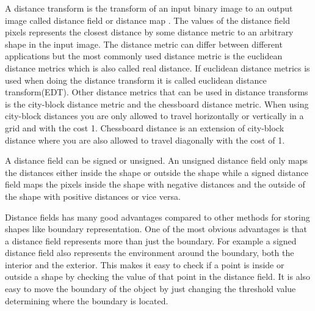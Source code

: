 A distance transform is the transform of an input binary image to an output image called distance field or distance map \citep{rosenfeld1966}. The values of the distance field pixels represents the closest distance by some distance metric to an arbitrary shape in the input image. The distance metric can differ between different applications but the most commonly used distance metric is the euclidean distance metrics which is also called real distance. If euclidean distance metrics is used when doing the distance transform it is called euclidean distance transform(EDT). Other distance metrics that can be used in distance transforms is the city-block distance metric and the chessboard distance metric. When using city-block distances you are only allowed to travel horizontally or vertically in a grid and with the cost 1. Chessboard distance is an extension of city-block distance where you are also allowed to travel diagonally with the cost of 1. 

A distance field can be signed or unsigned. An unsigned distance field only maps the distances either inside the shape or outside the shape while a signed distance field maps the pixels inside the shape with negative distances and the outside of the shape with positive distances or vice versa.

Distance fields has many good advantages compared to other methods for storing shapes like boundary representation. One of the most obvious advantages is that a distance field represents more than just the boundary. For example a signed distance field also represents the environment around the boundary, both the interior and the exterior. This makes it easy to check if a point is inside or outside a shape by checking the value of that point in the distance field. It is also easy to move the boundary of the object by just changing the threshold value determining where the boundary is located. \citep{Jones2006}

